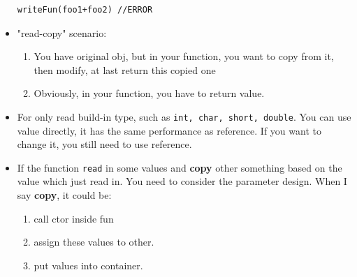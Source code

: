 \documentclass[a4paper,11pt,twoside]{book}
\begin{document}
\begin{itemize}
\begin{lstlisting}[numbers=none]
writeFun(foo1+foo2) //ERROR
\end{lstlisting}

\item "read-copy" scenario: 
\begin{enumerate}
	\item You have original obj, but in your function, you want to copy from it, then modify, at last return this copied one
	\item Obviously, in your function, you have to return value.
\end{enumerate}

\item For only read build-in type, such as \texttt{int, char, short, double}. You can use value directly, it has the same performance as reference. If you want to change it, you still need to use reference.

\item If the function \texttt{read} in some values and \textbf{copy} other something based on the value which just read in. You need to consider the parameter design. When I say \textbf{copy}, it could be:
\begin{enumerate}
	\item call ctor inside fun
	\item assign these values to other.
	\item put values into container.
\end{enumerate} 
\end{itemize}
\end{document}
